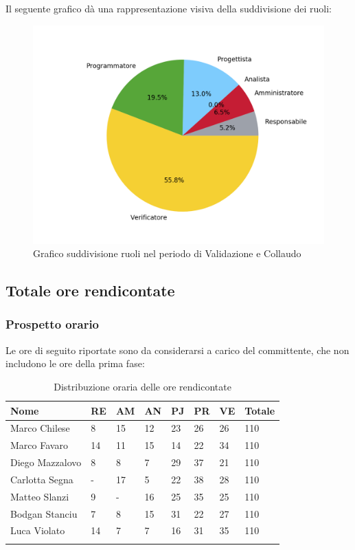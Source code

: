 Il seguente grafico dà una rappresentazione visiva della suddivisione dei ruoli:
\begin{figure}[H]
	\centering
	\includegraphics[width=0.8\linewidth]{./images/torta_vc.png}
	\caption{Grafico suddivisione ruoli nel periodo di Validazione e Collaudo}
	\label{fig:grafico suddivione ruoli periodo di Validazione e collaudo}
\end{figure}

\newpage

\subsection{Totale ore rendicontate}
\subsubsection{Prospetto orario}

Le ore di seguito riportate sono da considerarsi a carico del committente, che non includono le ore della prima fase:

\begin{longtable}{|C{.30\textwidth}|C{.06\textwidth}|C{.06\textwidth}|C{.06\textwidth} | C{.06\textwidth}| C{.06\textwidth} | C{.06\textwidth} | C{.10\textwidth} |}
\hline
\textbf{Nome} & \textbf{RE} & \textbf{AM} & \textbf{AN} & \textbf{PJ} & \textbf{PR} & \textbf{VE} & \textbf{Totale}\\
\hline 
Marco Chilese & 8 & 15 & 12 & 23 & 26 & 26 & 110\\
\hline
Marco Favaro & 14 & 11 & 15 & 14 & 22 & 34 & 110\\
\hline
Diego Mazzalovo & 8 & 8 & 7 & 29 & 37 & 21 & 110\\
\hline
Carlotta Segna & - & 17 & 5 & 22 & 38 & 28 & 110\\
\hline
Matteo Slanzi & 9 & - & 16 & 25 & 35 & 25 & 110\\
\hline
Bodgan Stanciu & 7 & 8 & 15 & 31 & 22 & 27 & 110\\
\hline
Luca Violato & 14 & 7 & 7 & 16 & 31 & 35 & 110 \\
\hline

\caption{Distribuzione oraria delle ore rendicontate}
\label{Distribuzione oraria delle ore rendicontate}
\end{longtable}

